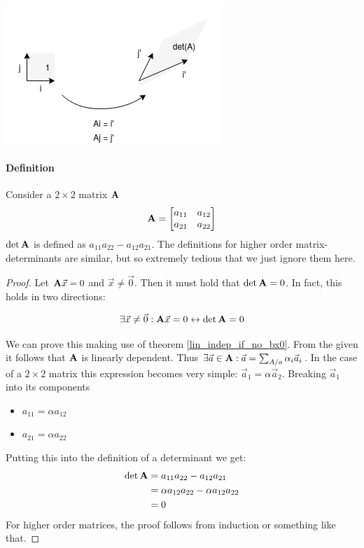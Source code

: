\includegraphics[width=0.4\linewidth]{images/determinant.png}


\paragraph{Definition} Consider a $2 \times 2$ matrix $\mathbf{A}$ 
$$
\mathbf{A} = 
\begin{bmatrix}
    a_{11} & a_{12} \\
    a_{21} & a_{22}
\end{bmatrix}
$$
$\det{\ensuremath{\mathbf{A}}}$ is defined as $a_{11}a_{22} - a_{12}a_{21}$. The definitions for higher order matrix-determinants are similar, but so extremely tedious that we just ignore them here. 

\begin{proof} \label{det_0}
    Let $ \mathbf{A} \vec{x} = 0 $ and $ \vec{x} \neq \vec{0}$. Then it must hold that $\det{\ensuremath{\mathbf{A}}} = 0$.
    In fact, this holds in two directions:

    $$ \exists \vec{x} \neq \vec{0}: \mathbf{A} \vec{x} = 0  \leftrightarrow \det{\ensuremath{\mathbf{A}}} = 0 $$

    We can prove this making use of theorem \ref{lin_indep_if_no_bx0}. From the given it follows that $\mathbf{A}$ is linearly dependent. 
    Thus $\exists \vec{a} \in \mathbf{A}: \vec{a} = \sum_{A/a} \alpha_i \vec{a}_i$. In the case of a $2 \times 2$ matrix this expression becomes very simple: $\vec{a}_1 = \alpha \vec{a}_2$. 
    Breaking $\vec{a}_1$ into its components
    \begin{itemize}
        \item $a_{11} = \alpha a_{12}$
        \item $a_{21} = \alpha a_{22}$
    \end{itemize}
    Putting this into the definition of a determinant we get:
    \begin{equation}
        \begin{aligned}
            \det{\ensuremath{\mathbf{A}}}  &= a_{11}a_{22} - a_{12}a_{21} \\
                            &= \alpha a_{12} a_{22} - \alpha a_{12} a_{22} \\
                            &= 0
        \end{aligned}
    \end{equation}
    For higher order matrices, the proof follows from induction or something like that.
\end{proof}



